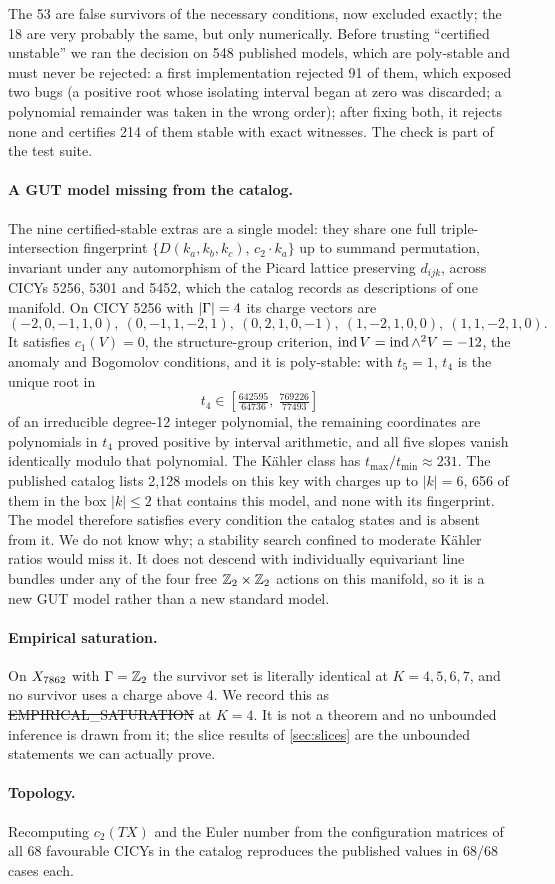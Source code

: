 The 53 are false survivors of the necessary conditions, now excluded exactly;
the 18 are very probably the same, but only numerically. Before trusting
``certified unstable'' we ran the decision on 548 published models, which are
poly-stable and must never be rejected: a first implementation rejected 91 of
them, which exposed two bugs (a positive root whose isolating interval began at
zero was discarded; a polynomial remainder was taken in the wrong order); after
fixing both, it rejects none and certifies 214 of them stable with exact
witnesses. The check is part of the test suite.

\paragraph{A GUT model missing from the catalog.} The nine certified-stable
extras are a single model: they share one full triple-intersection fingerprint
$\{D(k_a,k_b,k_c),\,c_2\cdot k_a\}$ up to summand permutation, invariant under any
automorphism of the Picard lattice preserving $d_{ijk}$, across CICYs 5256, 5301
and 5452, which the catalog records as descriptions of one manifold. On CICY 5256
with $|\Gamma|=4$ its charge vectors are
\[
(-2,0,-1,1,0),\ (0,-1,1,-2,1),\ (0,2,1,0,-1),\ (1,-2,1,0,0),\ (1,1,-2,1,0).
\]
It satisfies $c_1(V)=0$, the structure-group criterion, $\operatorname{ind} V=\operatorname{ind}\wedge^2V=-12$,
the anomaly and Bogomolov conditions, and it is poly-stable: with $t_5=1$, $t_4$ is
the unique root in
\[
t_4\in\left[\tfrac{642595}{64736},\ \tfrac{769226}{77493}\right]
\]
of an irreducible degree-12 integer polynomial, the remaining coordinates are
polynomials in $t_4$ proved positive by interval arithmetic, and all five slopes
vanish identically modulo that polynomial. The Kähler class has $t_{\max}/t_{\min}\approx231$. The published
catalog lists 2,128 models on this key with charges up to $|k|=6$, 656 of them in
the box $|k|\le2$ that contains this model, and none with its fingerprint. The
model therefore satisfies every condition the catalog states and is absent from
it. We do not know why; a stability search confined to moderate Kähler ratios
would miss it. It does not descend with individually equivariant line bundles
under any of the four free $\mathbb{Z}_2\times\mathbb{Z}_2$ actions on this manifold, so it is a
new GUT model rather than a new standard model.

\paragraph{Empirical saturation.} On $X_{7862}$ with $\Gamma=\mathbb{Z}_2$ the survivor set is
literally identical at $K=4,5,6,7$, and no survivor uses a charge above 4. We
record this as \st{EMPIRICAL\_SATURATION} at $K=4$. It is not a theorem and no
unbounded inference is drawn from it; the slice results of \cref{sec:slices}
are the unbounded statements we can actually prove.

\paragraph{Topology.} Recomputing $c_2(TX)$ and the Euler number from the
configuration matrices of all 68 favourable CICYs in the catalog reproduces the
published values in 68/68 cases each.
